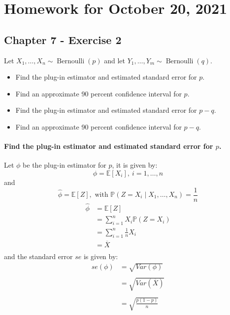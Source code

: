 \documentclass{article}
\newcommand{\E}{\mathbb{E}}
\renewcommand{\P}{\mathbb{P}}
\begin{document}
\section{Homework for October 20, 2021}
\subsection{Chapter 7 - Exercise 2}

Let $X_{1}, \ldots, X_{n} \sim \operatorname{Bernoulli}(p)$ and let $Y_{1}, \ldots, Y_{m} \sim \operatorname{Bernoulli}(q)$.
\begin{itemize}
    \item Find the plug-in estimator and estimated standard error for $p$.
    \item Find an approximate 90 percent confidence interval for $p$.
    \item Find the plug-in estimator and estimated standard error for $p-q$.
    \item Find an approximate 90 percent confidence interval for $p-q$.
\end{itemize}


\paragraph{Find the plug-in estimator and estimated standard error for $p$.\\}
Let \(\phi\) be the plug-in estimator for \(p\), it is given by:
\[
    \phi = \E[X_i], \ i = 1, \ldots, n
\]
and
\[
    \hat \phi = \E[Z], \text{ with } \P (Z = X_i \mid X_1, \ldots, X_n) = \frac{1}{n}
\]
\begin{align*}
    \hat \phi
     & = \E[Z]                        \\
     & = \sum_{i=1}^n X_i \P(Z = X_i) \\
     & = \sum_{i=1}^n \frac{1}{n} X_i \\
     & = \overline X                  \\
\end{align*}
and the standard error \(se\) is given by:
\begin{align*}
    se (\phi)
     & = \sqrt{Var(\phi)}                   \\                                                                                                                              \\
     & = \sqrt{Var\left(\overline X\right)} \\                                                                                                                              \\
     & = \sqrt{\frac{p(1-p)}{n}}            \\                                                                                                                              \\
\end{align*}
\end{document}
